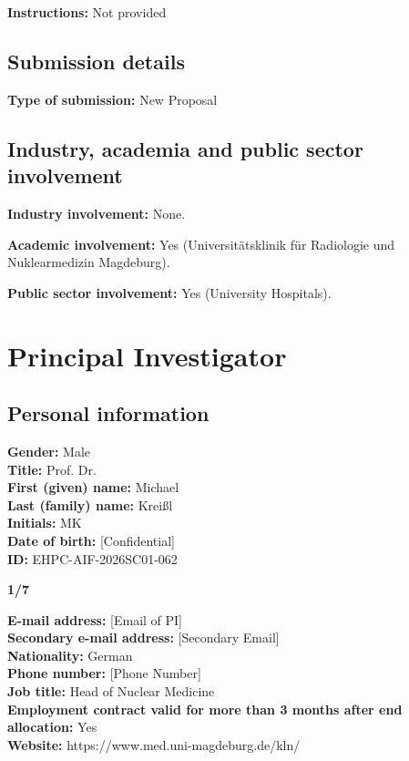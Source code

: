 \documentclass[11pt, a4paper]{article}
\begin{document}
\vspace{0.5em}
\noindent\textbf{Instructions:} Not provided

\subsection*{Submission details}

\noindent\textbf{Type of submission:} New Proposal

\subsection*{Industry, academia and public sector involvement}

\noindent\textbf{Industry involvement:} None.

\vspace{0.5em}
\noindent\textbf{Academic involvement:} Yes (Universitätsklinik für Radiologie und Nuklearmedizin Magdeburg).

\vspace{0.5em}
\noindent\textbf{Public sector involvement:} Yes (University Hospitals).

\section*{Principal Investigator}

\subsection*{Personal information}

\noindent\textbf{Gender:} Male \\
\textbf{Title:} Prof. Dr. \\
\textbf{First (given) name:} Michael \\
\textbf{Last (family) name:} Kreißl \\
\textbf{Initials:} MK \\
\textbf{Date of birth:} [Confidential] \\
\textbf{ID:} EHPC-AIF-2026SC01-062

\vspace{0.5em}
\noindent\textbf{1/7}

\vspace{0.5em}
\noindent\textbf{E-mail address:} [Email of PI] \\
\textbf{Secondary e-mail address:} [Secondary Email] \\
\textbf{Nationality:} German \\
\textbf{Phone number:} [Phone Number] \\
\textbf{Job title:} Head of Nuclear Medicine \\
\textbf{Employment contract valid for more than 3 months after end allocation:} Yes \\
\textbf{Website:} https://www.med.uni-magdeburg.de/kln/
\end{document}
